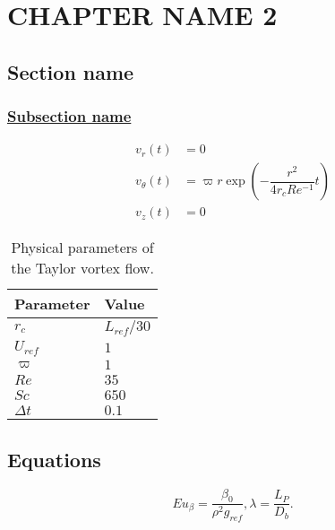 \chapter{\textbf{CHAPTER NAME 2}} 

\section{\textbf{Section name}}

\subsection{\underline{Subsection name}}

\lipsum[1-2]
\begin{subequations}
\begin{align} 
v_r(t) &= 0 \label{eq:taylor-v1} \\
v_{\theta}(t) &= \varpi r \exp \left( - \dfrac{r^2}{4r_cRe^{-1}}t \right)  \label{eq:taylor-v2} \\
v_z(t) &= 0 \label{eq:taylor-v3}
\end{align}
\end{subequations}

\lipsum[2-5]

\begin{table}
\centering
\begin{tabular}{ll}
\toprule
Parameter & Value \\
\midrule
$ r_c $          		  & $ L_{ref}/30 $ \\ 
$ U_{ref} $            & $ 1 $	              \\
$ \varpi $              & $ 1 $				  \\
$ Re $                    & $ 35 $  			  \\
$ Sc $                    & $ 650 $  		   \\
$ \Delta t $           & $ 0.1 $              \\
\bottomrule
\end{tabular}
\caption{Physical parameters of the Taylor vortex flow.}
\label{tbl:taylor-vortex-parameters}
\end{table}

\section{\textbf{Equations}}

\lipsum[1-3]
\begin{equation}
\label{eq:Eu}
Eu_{\beta} = \frac{\beta_0}{\rho^2 g_{ref}},  \lambda = \frac{L_P}{D_b}.
\end{equation}

